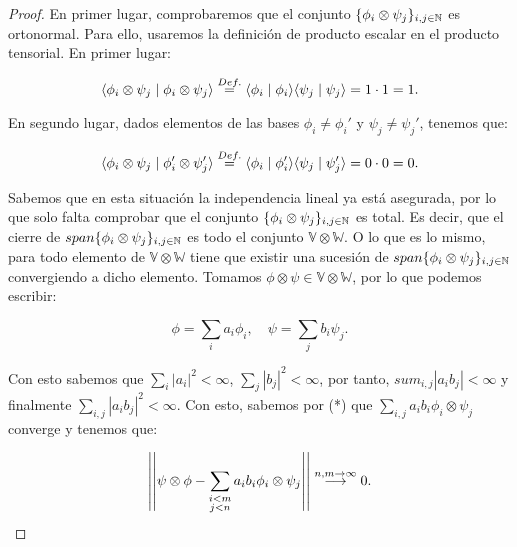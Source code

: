 \begin{proof}

    En primer lugar, comprobaremos que el conjunto $\conjunto{\phi_i \otimes \psi_j}_{i, j \in \N}$ es ortonormal. Para ello, usaremos la definición de producto escalar en el producto tensorial. En primer lugar:

    \begin{equation}
        \innerproduct{\phi_i \otimes \psi_j}{\phi_i \otimes \psi_j} \encima{=}{Def.} \innerproduct{\phi_i}{\phi_i} \innerproduct{\psi_j}{\psi_j} = 1 \cdot 1 = 1.
    \end{equation}

    En segundo lugar, dados elementos de las bases $\phi_i \neq \phi_i'$ y $\psi_j \neq \psi_j'$, tenemos que:

    \begin{equation}
        \innerproduct{\phi_i \otimes \psi_j}{\phi_i' \otimes \psi_j'} \encima{=}{Def.} \innerproduct{\phi_i}{\phi_i'} \innerproduct{\psi_j}{\psi_j'} = 0 \cdot 0 = 0.
    \end{equation}

    Sabemos que en esta situación la independencia lineal ya está asegurada, por lo que solo falta comprobar que el conjunto $\conjunto{\phi_i \otimes \psi_j}_{i, j \in \N}$ es total. Es decir, que el cierre de $span\conjunto{\phi_i \otimes \psi_j}_{i, j \in \N}$ es todo el conjunto $\mathbb{V} \otimes \mathbb{W}$. O lo que es lo mismo, para todo elemento de $\mathbb{V} \otimes \mathbb{W}$ tiene que existir una sucesión de $span\conjunto{\phi_i \otimes \psi_j}_{i, j \in \N}$ convergiendo a dicho elemento. Tomamos $\phi \otimes \psi \in \mathbb{V} \otimes \mathbb{W}$, por lo que podemos escribir:

    \begin{equation}
        \phi = \sum_{i} a_i \phi_i, \quad \psi = \sum_j b_i \psi_j.
    \end{equation}

    Con esto sabemos que $\sum_i |a_i|^2 < \infty$, $\sum_j |b_j|^2 < \infty$, por tanto, $sum_{i, j} |a_i b_j| < \infty$ y finalmente $\sum_{i, j} |a_i b_j|^2 < \infty$. Con esto, sabemos por (*) que $\sum_{i, j} a_i b_i \phi_i \otimes \psi_j$ converge y tenemos que:

    \begin{equation}
        \left|\left| \psi \otimes \phi - \sum_{\substack{i < m \\ j < n}} a_i b_i \phi_i \otimes \psi_j \right|\right| \encima{\longrightarrow}{n, m \to \infty} 0.
    \end{equation}


\end{proof}
